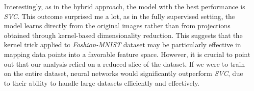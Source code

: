 Interestingly, as in the hybrid approach, the model with the best performance is \emph{SVC}. This outcome surprised me a lot, 
as in the fully supervised setting, the model learns directly from the original images rather than from projections 
obtained through kernel-based dimensionality reduction. This suggests that the kernel trick applied to \emph{Fashion-MNIST} dataset may 
be particularly effective in mapping data points into a favorable feature space. However, it is crucial to point out that our 
analysis relied on a reduced slice of the dataset. If we were to train on the entire dataset, neural networks would significantly 
outperform \emph{SVC}, due to their ability to handle large datasets efficiently and effectively.



